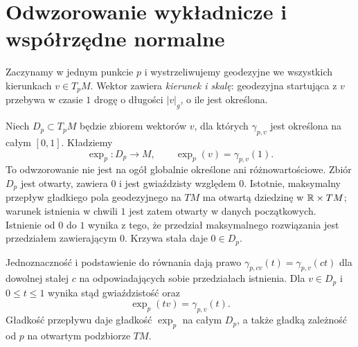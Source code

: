 \section{Odwzorowanie wykładnicze i współrzędne normalne}
\label{sec:exp-normalne}

Zaczynamy w jednym punkcie $p$ i wystrzeliwujemy
geodezyjne we wszystkich kierunkach $v\in T_pM$.
Wektor zawiera \emph{kierunek i skalę}: geodezyjna
startująca z $v$ przebywa w czasie $1$ drogę
o długości $|v|_g$, o ile jest określona.

\begin{definicja}
\label{def:exp-geodezyjna}
Niech $D_p\subset T_pM$ będzie zbiorem wektorów
$v$, dla których $\gamma_{p,v}$ jest określona
na całym $[0,1]$. Kładziemy
\begin{equation}\label{eq:exp-definicja}
 \exp_p:D_p\longrightarrow M,
 \qquad \exp_p(v)=\gamma_{p,v}(1).
\end{equation}
To odwzorowanie nie jest na ogół globalnie
określone ani różnowartościowe. Zbiór $D_p$ jest otwarty,
zawiera $0$ i jest gwiaździsty względem $0$. Istotnie,
maksymalny przepływ gładkiego pola geodezyjnego na $TM$
ma otwartą dziedzinę w $\mathbb{R}\times TM$; warunek istnienia
w chwili $1$ jest zatem otwarty w danych początkowych.
Istnienie od $0$ do $1$ wynika z tego, że przedział
maksymalnego rozwiązania jest przedziałem zawierającym $0$.
Krzywa stała daje $0\in D_p$.

Jednoznaczność i podstawienie do równania dają prawo
$\gamma_{p,cv}(t)=\gamma_{p,v}(ct)$ dla dowolnej stałej $c$
na odpowiadających sobie przedziałach istnienia.
Dla $v\in D_p$ i $0\leq t\leq1$ wynika stąd
gwiaździstość oraz
\begin{equation}\label{eq:exp-skalowanie}
 \exp_p(tv)=\gamma_{p,v}(t).
\end{equation}
Gładkość przepływu daje gładkość $\exp_p$ na całym $D_p$,
a także gładką zależność od $p$ na otwartym podzbiorze $TM$.
\end{definicja}

